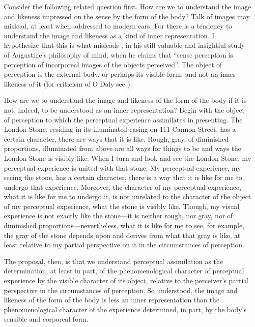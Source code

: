 \documentclass[12pt]{article}
\begin{document}
Consider the following related question first. How are we to understand the image and likeness impressed on the sense by the form of the body? Talk of images may mislead, at least when addressed to modern ears. For there is a tendency to understand the image and likeness as a kind of inner representation. I hypothesize that this is what misleads \citet[106]{ODaly:1987fq}, in his still valuable and insightful study of Augustine's philosophy of mind, when he claims that ``sense perception is perception of incorporeal images of the objects perceived''. The object of perception is the external body, or perhaps its visible form, and not an inner likeness of it (for criticism of O'Daly see \citealt{Matthews:2014aa,Silva:2014bh}).

How are we to understand the image and likeness of the form of the body if it is not, indeed, to be understood as an inner representation? Begin with the object of perception to which the perceptual experience assimilates in presenting. The London Stone, residing in its illuminated casing on 111 Cannon Street, has a certain character, there are ways that it is like. Rough, gray, of diminished proportions, illuminated from above are all ways for things to be and ways the London Stone is visibly like. When I turn and look and see the London Stone, my perceptual experience is united with that stone. My perceptual experience, my seeing the stone, has a certain character, there is a way that it is like for me to undergo that experience. Moreover, the character of my perceptual experience, what it is like for me to undergo it, is not unrelated to the character of the object of my perceptual experience, what the stone is visibly like. Though, my visual experience is not exactly like the stone---it is neither rough, nor gray, nor of diminished proportions---nevertheless, what it is like for me to see, for example, the gray of the stone depends upon and derives from what that gray is like, at least relative to my partial perspective on it in the circumstances of perception. 

The proposal, then, is that we understand perceptual assimilation as the determination, at least in part, of the phenomenological character of perceptual experience by the visible character of its object, relative to the perceiver's partial perspective in the circumstances of perception. So understood, the image and likeness of the form of the body is less an inner representation than the phenomenological character of the experience determined, in part, by the body's sensible and corporeal form.
\end{document}
